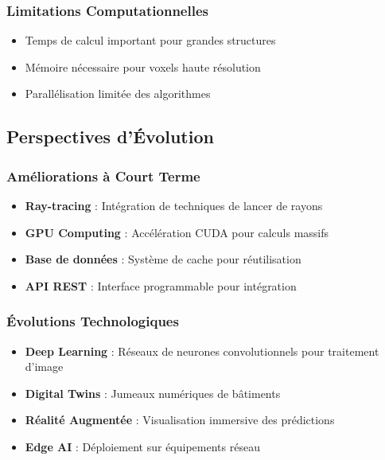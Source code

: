 \documentclass[12pt,a4paper]{article}
\begin{document}
\subsubsection{Limitations Computationnelles}

\begin{itemize}
    \item Temps de calcul important pour grandes structures
    \item Mémoire nécessaire pour voxels haute résolution
    \item Parallélisation limitée des algorithmes
\end{itemize}

\subsection{Perspectives d'Évolution}

\subsubsection{Améliorations à Court Terme}

\begin{itemize}
    \item \textbf{Ray-tracing} : Intégration de techniques de lancer de rayons
    \item \textbf{GPU Computing} : Accélération CUDA pour calculs massifs
    \item \textbf{Base de données} : Système de cache pour réutilisation
    \item \textbf{API REST} : Interface programmable pour intégration
\end{itemize}

\subsubsection{Évolutions Technologiques}

\begin{itemize}
    \item \textbf{Deep Learning} : Réseaux de neurones convolutionnels pour traitement d'image
    \item \textbf{Digital Twins} : Jumeaux numériques de bâtiments
    \item \textbf{Réalité Augmentée} : Visualisation immersive des prédictions
    \item \textbf{Edge AI} : Déploiement sur équipements réseau
\end{itemize}
\end{document}
